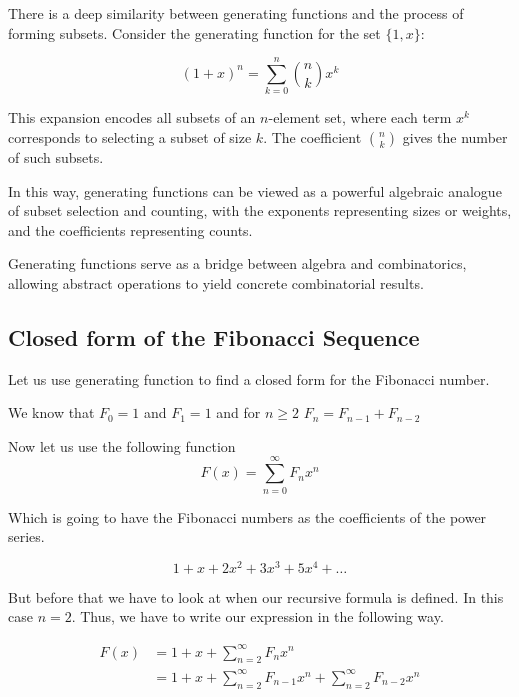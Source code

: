 There is a deep similarity between generating functions and the process of forming subsets. Consider the 
generating function for the set \( \{1, x\} \):

\[
    {(1 + x)}^n = \sum_{k=0}^n \binom{n}{k} x^k
\]

This expansion encodes all subsets of an \( n \)-element set, where each term \( x^k \) corresponds to 
selecting a subset of size \( k \). The coefficient \( \binom{n}{k} \) gives the number of such subsets.
\vspace{\baselineskip}

In this way, generating functions can be viewed as a powerful algebraic analogue of subset selection and 
counting, with the exponents representing sizes or weights, and the coefficients representing counts.
\vspace{\baselineskip}

Generating functions serve as a bridge between algebra and combinatorics, allowing abstract operations to 
yield concrete combinatorial results.

\subsection{Closed form of the Fibonacci Sequence}

Let us use generating function to find a closed form for the Fibonacci number. 
\vspace{\baselineskip}

We know that \(F_0 = 1\) and \(F_1 = 1\) and for \(n \ge 2\) \(F_n = F_{n-1} + F_{n-2}\)
\vspace{\baselineskip}

Now let us use the following function
\[
    F(x) = \sum_{n = 0}^{\infty} F_n x^{n}
\]

Which is going to have the Fibonacci numbers as the coefficients of the power series.

\[
    1 + x + 2x^2 + 3x^3 + 5x^4 + \dots
\]

But before that we have to look at when our recursive formula is defined.
In this case \(n = 2\). Thus, we have to write our expression in the following way.

\begin{align*}
    F(x) &= 1 + x + \sum_{n = 2}^{\infty} F_n x^{n}\\
    &= 1 + x + \sum_{n = 2}^{\infty} F_{n -1} x^{n} + \sum_{n = 2}^{\infty} F_{n - 2}x^n 
\end{align*}


